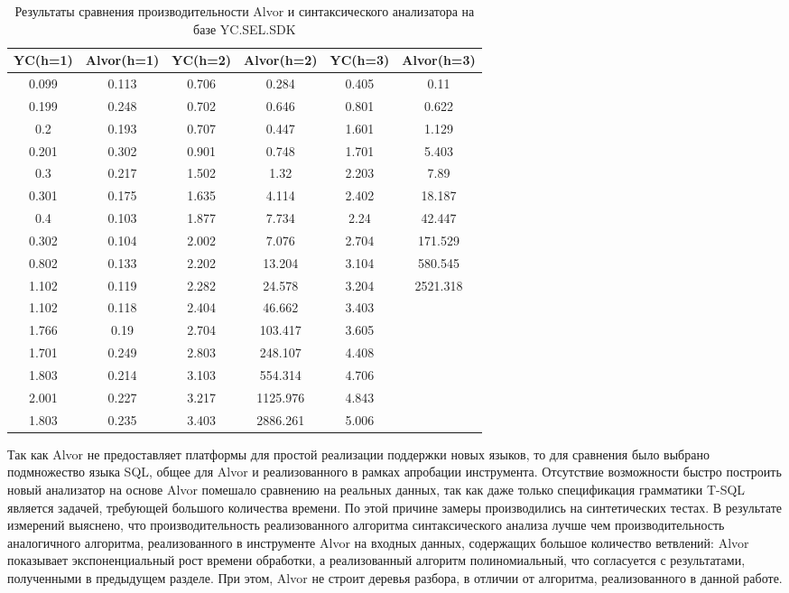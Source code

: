 \begin{table} [htbp]
  \centering
  \parbox{14cm}{\caption{Результаты сравнения производительности Alvor и синтаксического анализатора на базе YC.SEL.SDK}\label{tbl:YCvsAlvor}}
  \begin{tabular}{| c | c | c | c | c | c |}
  \hline                               
  \hline
  YC(h=1) & Alvor(h=1) & YC(h=2) & Alvor(h=2) & YC(h=3) & Alvor(h=3)\\
  \hline 
0.099 &  0.113 &  0.706 &  0.284   & 0.405 &  0.11     \\
0.199 &  0.248 &  0.702 &  0.646   & 0.801 &  0.622    \\
0.2   &  0.193 &  0.707 &  0.447   & 1.601 &  1.129    \\
0.201 &  0.302 &  0.901 &  0.748   & 1.701 &  5.403    \\
0.3   &  0.217 &  1.502 &  1.32    & 2.203 &  7.89     \\
0.301 &  0.175 &  1.635 &  4.114   & 2.402 &  18.187   \\
0.4   &  0.103 &  1.877 &  7.734   & 2.24  &  42.447   \\
0.302 &  0.104 &  2.002 &  7.076   & 2.704 &  171.529  \\
0.802 &  0.133 &  2.202 &  13.204  & 3.104 &  580.545  \\
1.102 &  0.119 &  2.282 &  24.578  & 3.204 &  2521.318 \\
1.102 &  0.118 &  2.404 &  46.662  & 3.403 &           \\
1.766 &  0.19  &  2.704 &  103.417 & 3.605 &           \\
1.701 &  0.249 &  2.803 &  248.107 & 4.408 &           \\
1.803 &  0.214 &  3.103 &  554.314 & 4.706 &           \\
2.001 &  0.227 &  3.217 &  1125.976& 4.843 &           \\
1.803 &  0.235 &  3.403 &  2886.261& 5.006 &           \\
  \hline
  \hline

  \end{tabular}
\end{table}

Так как Alvor не предоставляет платформы для простой реализации поддержки новых языков, то для сравнения было выбрано подмножество языка SQL, общее для Alvor и реализованного в рамках апробации инструмента. Отсутствие возможности быстро построить новый анализатор на основе Alvor помешало сравнению на реальных данных, так как даже только спецификация грамматики T-SQL является задачей, требующей большого количества времени. По этой причине замеры производились на синтетических тестах. В результате измерений выяснено, что производительность реализованного алгоритма синтаксического анализа лучше чем производительность аналогичного алгоритма, реализованного в инструменте Alvor на входных данных, содержащих большое количество ветвлений: Alvor показывает экспоненциальный рост времени обработки, а реализованный алгоритм полиномиальный, что согласуется с результатами, полученными в предыдущем разделе. При этом, Alvor не строит деревья разбора, в отличии от алгоритма, реализованного в данной работе.

